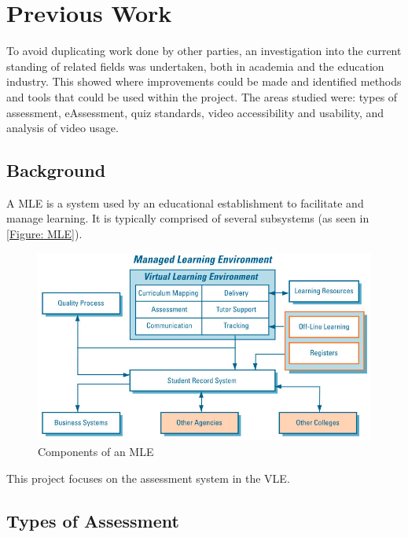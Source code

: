 \chapter{Previous Work}
\label{Chapter:Previous Work}

\begin{preamble}
	To avoid duplicating work done by other parties, an investigation into the current standing of related fields was undertaken, both in academia and the education industry. This showed where improvements could be made and identified methods and tools that could be used within the project. The areas studied were: types of assessment, eAssessment, quiz standards, video accessibility and usability, and analysis of video usage.
\end{preamble}

\section{Background}
\label{Section: Background}
A \gls{MLE} is a system used by an educational establishment to facilitate and manage learning. It is typically comprised of several subsystems (as seen in \autoref{Figure: MLE}).

\begin{figure}[h]
	\centering
	\includegraphics[scale=0.4]{../figures/MLE.png}
	\caption{\label{Figure: MLE} Components of an \gls{MLE} \citep{mle}}
\end{figure}

This project focuses on the assessment system in the \gls{VLE}.

\section{Types of Assessment}
\label{Section: Types of Assessment}

